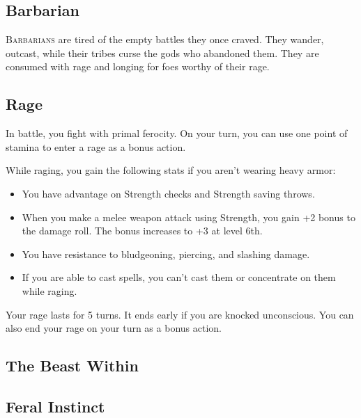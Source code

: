
\begin{multicols*}{2}



\section{Barbarian}

\lettrine[lines=3, lhang=0.15, loversize=0.25, findent=.5em]{B}{arbarians} are tired of the empty battles they once craved. They wander, outcast, while their tribes curse the gods who abandoned them. They are consumed with rage and longing for foes worthy of their rage.

\subsection*{Rage}

In battle, you fight with primal ferocity. On your turn, you can use one point of stamina to enter a rage as a bonus action.



While raging, you gain the following stats if you aren’t wearing heavy armor:


\begin{itemize}
    \item You have advantage on Strength checks and Strength saving throws.
    \item When you make a melee weapon attack using Strength, you gain +2 bonus to the damage roll. The bonus increases to +3 at level 6th.
    \item You have resistance to bludgeoning, piercing, and slashing damage.
    \item If you are able to cast spells, you can’t cast them or concentrate on them while raging.
\end{itemize}


Your rage lasts for 5 turns. It ends early if you are knocked unconscious. You can also end your rage on your turn as a bonus action.



\subsection*{The Beast Within}

\subsection*{Feral Instinct}


\end{multicols*}

